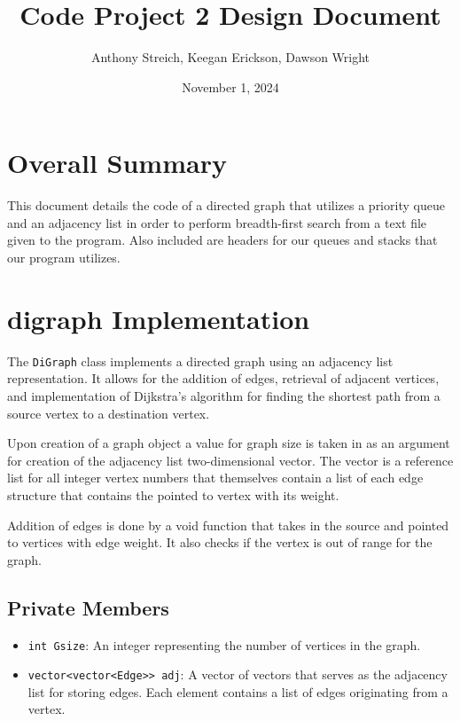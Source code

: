 \documentclass{article}
\begin{document}
\title{Code Project 2 Design Document}
\author{Anthony Streich, Keegan Erickson, Dawson Wright}
\date{November 1, 2024}
\maketitle

\section{Overall Summary}

This document details the code of a directed graph that utilizes a priority queue and an adjacency list in order to perform breadth-first search from a text file given to the program. Also included are headers for our queues and stacks that our program utilizes.

\maketitle

\section{digraph Implementation}
The \texttt{DiGraph} class implements a directed graph using an adjacency list representation. It allows for the addition of edges, retrieval of adjacent vertices, and implementation of Dijkstra's algorithm for finding the shortest path from a source vertex to a destination vertex.

Upon creation of a graph object a value for graph size is taken in as an argument for creation of the adjacency list two-dimensional vector. The vector is a reference list for all integer vertex numbers that themselves contain a list of each edge structure that contains the pointed to vertex with its weight.

Addition of edges is done by a void function that takes in the source and pointed to vertices with edge weight. It also checks if the vertex is out of range for the graph. 


\subsection{Private Members}
\begin{itemize}
    \item \texttt{int Gsize}: An integer representing the number of vertices in the graph.
    \item \texttt{vector<vector<Edge>> adj}: A vector of vectors that serves as the adjacency list for storing edges. Each element contains a list of edges originating from a vertex.
\end{itemize}
\end{document}
